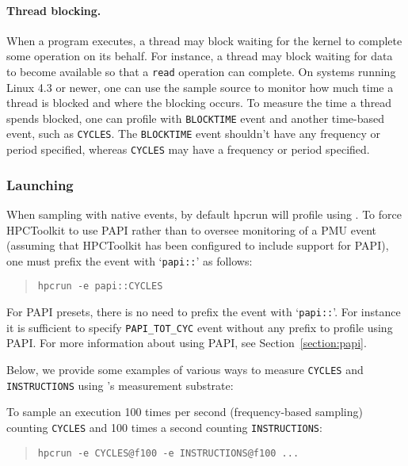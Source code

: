 \paragraph{Thread blocking.} When a program executes, 
a thread may block waiting for the kernel to complete some operation on its behalf.
For instance, a thread may block waiting for data to become available so that a {\tt read} operation 
can complete. On systems running Linux 4.3 or newer, one can use the \perfevents{} sample source to monitor how much time a thread is blocked and where the blocking occurs. To measure
the time a thread spends blocked, one can profile with \verb|BLOCKTIME| event and
another time-based event, such as \verb|CYCLES|. The \verb|BLOCKTIME| event shouldn't have any frequency or period specified, whereas \verb|CYCLES| may have a frequency or period specified.

\subsubsection{Launching}
\label{sec:perf-launching}

When sampling with native events, by default hpcrun will profile using \perfevents{}. 
To force HPCToolkit to use PAPI rather than \perfevents{} to oversee monitoring of a PMU event 
(assuming that HPCToolkit has been configured to include support for PAPI),
one must prefix the event with \lq{\verb|papi::|}\rq{} as follows:

\begin{quote}
\begin{verbatim}
hpcrun -e papi::CYCLES
\end{verbatim}
\end{quote}

\noindent For PAPI presets, there is no need to prefix the event with
 \lq{\verb|papi::|}\rq. For instance it is sufficient to specify \verb|PAPI_TOT_CYC| event
without any prefix to profile using PAPI. For more information about using PAPI, see Section~\ref{section:papi}.

Below, we provide some examples of various ways to measure \verb|CYCLES| 
and \verb|INSTRUCTIONS|  using \HPCToolkit{}'s \perfevents{} measurement substrate:

To sample an execution 100 times per second (frequency-based sampling) counting \verb|CYCLES| 
and 100 times a second counting \verb|INSTRUCTIONS|:
\begin{quote}
\begin{verbatim}
hpcrun -e CYCLES@f100 -e INSTRUCTIONS@f100 ...
\end{verbatim}
\end{quote}

